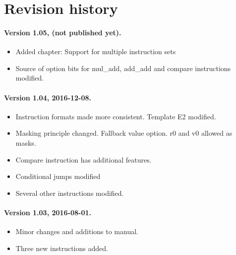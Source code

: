 \documentclass[forwardcom.tex]{subfiles}
\begin{document}
\RaggedRight

\chapter{Revision history}

\subsubsection{Version 1.05, (not published yet).}
\begin{itemize}
\item Added chapter: Support for multiple instruction sets
\item Source of option bits for mul\_add, add\_add and compare instructions modified.
\end{itemize}


\subsubsection{Version 1.04, 2016-12-08.}
\begin{itemize}
\item Instruction formats made more consistent. Template E2 modified.
\item Masking principle changed. Fallback value option. r0 and v0 allowed as masks.
\item Compare instruction has additional features.
\item Conditional jumps modified
\item Several other instructions modified.
\end{itemize}


\subsubsection{Version 1.03, 2016-08-01.}
\begin{itemize}
\item Minor changes and additions to manual.
\item Three new instructions added.
\end{itemize}
\end{document}
